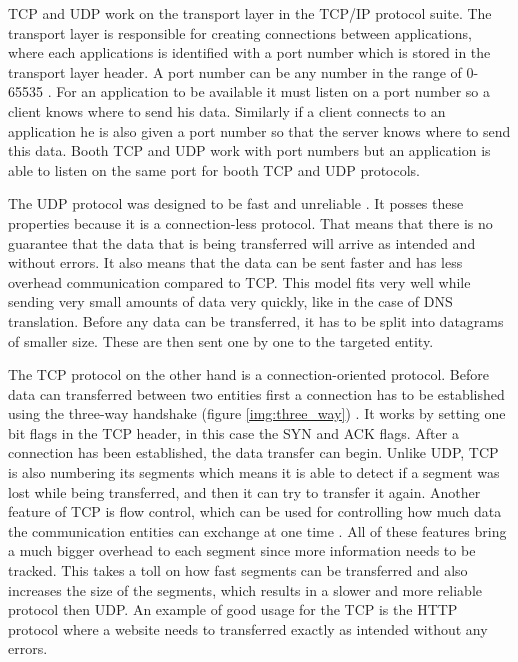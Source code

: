 TCP and UDP work on the transport layer in the TCP/IP protocol suite. The transport layer is responsible for creating connections between applications, where each applications is identified with a port number which is stored in the transport layer header. A port number can be any number in the range of 0-65535 \cite{Forouzan2010}. For an application to be available it must listen on a port number so a client knows where to send his data. Similarly if a client connects to an application he is also given a port number so that the server knows where to send this data. Booth TCP and UDP work with port numbers but an application is able to listen on the same port for booth TCP and UDP protocols.

The UDP protocol was designed to be fast and unreliable \cite{Forouzan2010}. It posses these properties because it is a connection-less protocol. That means that there is no guarantee that the data that is being transferred will arrive as intended and without errors. It also means that the data can be sent faster and has less overhead communication compared to TCP. This model fits very well while sending very small amounts of data very quickly, like in the case of DNS translation. Before any data can be transferred, it has to be split into datagrams of smaller size. These are then sent one by one to the targeted entity.

The TCP protocol on the other hand is a connection-oriented protocol. Before data can transferred between two entities first a connection has to be established using the three-way handshake (figure \ref{img:three_way}) \cite{Forouzan2010}. It works by setting one bit flags in the TCP header, in this case the SYN and ACK flags. After a connection has been established, the data transfer can begin. Unlike UDP, TCP is also numbering its segments which means it is able to detect if a segment was lost while being transferred, and then it can try to transfer it again. Another feature of TCP is flow control, which can be used for controlling how much data the communication entities can exchange at one time \cite{Forouzan2010}. All of these features bring a much bigger overhead to each segment since more information needs to be tracked. This takes a toll on how fast segments can be transferred and also increases the size of the segments, which results in a slower and more reliable protocol then UDP. An example of good usage for the TCP is the HTTP protocol where a website needs to transferred exactly as intended without any errors.


